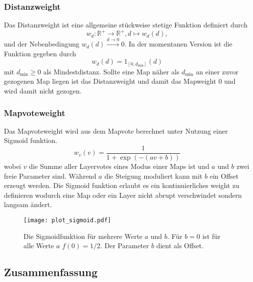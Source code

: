     \subsubsection{Distanzweight}
        Das Distanzweight ist eine allgemeine stückweise stetige Funktion definiert durch
        \begin{equation}
            w_d : \mathbb{R}^+ \rightarrow \mathbb{R}^+, d \mapsto w_d(d),
        \end{equation}
        und der Nebenbedingung $w_d(d)\overset{d\rightarrow 0}{\longrightarrow}0$.
        In der momentanen Version ist die Funktion gegeben durch
        \begin{equation}
            w_d(d) = 1_{[0,d_\text{min}]}(d)
        \end{equation}
        mit $d_\text{min}\geq 0$ als Mindestdistanz. 
        Sollte eine Map näher als $d_\text{min}$ an einer zuvor gezogenen Map liegen ist das Distanzweight und damit das Mapweight $0$ und wird damit nicht gezogen. 
    \subsubsection{Mapvoteweight}
        Das Mapvoteweight wird aus dem Mapvote berechnet unter Nutzung einer Sigmoid funktion. 
        \begin{equation}
            w_v(v) = \frac{1}{1+\exp\left(-(av+b)\right)}
        \end{equation}
        wobei $v$ die Summe aller Layervotes eines Modus einer Maps ist und $a$ und $b$ zwei freie Parameter sind.
        Während $a$ die Steigung moduliert kann mit $b$ ein Offset erzeugt werden.
        Die Sigmoid funktion erlaubt es ein kontinuierliches weight zu definieren wodurch eine Map oder ein Layer nicht abrupt verschwindet sondern langsam ändert.
        \begin{figure}[htbp]
            \centering
            \texttt{[image: plot\_sigmoid.pdf]}
            \caption{Die Sigmoidfunktion für mehrere Werte $a$ und $b$. 
                        Für $b=0$ ist für alle Werte $a$ $f(0)=1/2$.
                        Der Parameter $b$ dient als Offset.}
        \end{figure}
    \subsection{Zusammenfassung}

